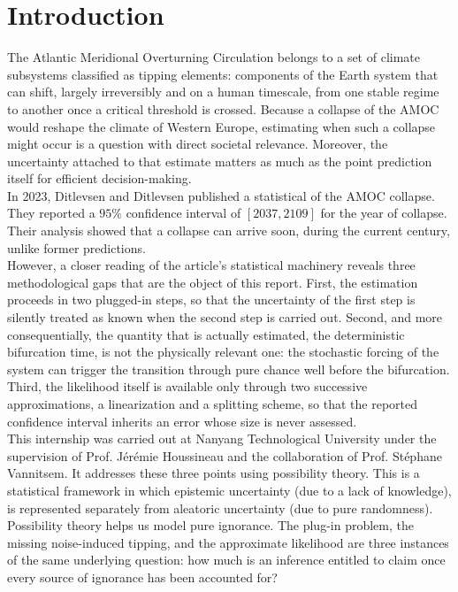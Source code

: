 \documentclass[12pt,a4paper]{article}
\theoremstyle{definition}
\theoremstyle{plain}
\begin{document}
\newpage

\section{Introduction}

The Atlantic Meridional Overturning Circulation belongs to a set of climate
subsystems classified as tipping elements: components of the Earth system that can shift,
largely irreversibly and on a human timescale, from one stable regime to another once a
critical threshold is crossed. Because a collapse of the AMOC would reshape the climate of Western Europe, estimating when such a collapse might occur is a
question with direct societal relevance. Moreover, the uncertainty attached to that estimate matters
as much as the point prediction itself for efficient decision-making. \\
 
\noindent In 2023, Ditlevsen and Ditlevsen published \cite{ditlevsen2023} a statistical of the AMOC collapse. They
reported a $95\%$ confidence interval of $[2037,2109]$ for the year of collapse. Their analysis showed that a collapse can arrive soon, during the current century, unlike former predictions. \\
 
\noindent However, a closer reading of the article's statistical machinery reveals three methodological gaps that are
the object of this report. First, the estimation proceeds in two plugged-in steps, so that the
uncertainty of the first step is silently treated as known when the second step is carried
out. Second, and more consequentially, the quantity that is actually estimated, the deterministic bifurcation time, is not the physically relevant one: the stochastic forcing of
the system can trigger the transition through pure chance well before the bifurcation. Third, the likelihood itself is available only through two successive
approximations, a linearization and a splitting scheme, so that the reported confidence
interval inherits an error whose size is never assessed. \\
 
\noindent This internship was carried out at Nanyang Technological University under the supervision of
Prof. Jérémie Houssineau and the collaboration of Prof. Stéphane Vannitsem. It addresses these three points using possibility theory. This is a statistical framework in
which epistemic uncertainty (due to a lack of knowledge), is represented separately from aleatoric uncertainty (due to pure randomness). Possibility theory helps us model pure ignorance. The plug-in problem, the missing noise-induced tipping, and the approximate
likelihood are three instances of the same underlying question: how much is an inference
entitled to claim once every source of ignorance has been accounted for? \\
 
\end{document}
